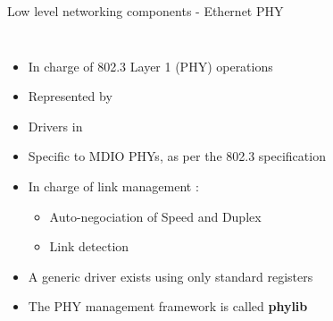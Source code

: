 \begin{frame}{Low level networking components - Ethernet PHY}
\begin{columns}
		\begin{itemize}
			\item In charge of 802.3 Layer 1 (PHY) operations
			\item Represented by 
			\item Drivers in 
			\item Specific to MDIO PHYs, as per the 802.3 specification
			\item In charge of link management :
				\begin{itemize}
					\item Auto-negociation of Speed and Duplex
					\item Link detection
				\end{itemize}
			\item A generic driver exists using only standard registers
			\item The PHY management framework is called \textbf{phylib}
		\end{itemize}
	\end{columns}
\end{frame}
